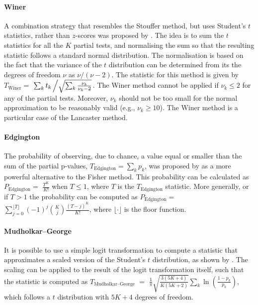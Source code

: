 \paragraph{Winer} A combination strategy that resembles the Stouffer method, but uses Student's $t$ statistics, rather than $z$-scores was proposed by \citet{Winer1962}. The idea is to sum the $t$ statistics for all the $K$ partial tests, and normalising the sum so that the resulting statistic follows a standard normal distribution. The normalisation is based on the fact that the variance of the $t$ distribution can be determined from its the degrees of freedom $\nu$ as $\nu/(\nu-2)$. The statistic for this method is given by $T_{\text{Winer}}=$ $\sum_{k}t_{k}\left/\sqrt{\sum_{k}\frac{\nu_{k}}{\nu_{k}-2}}\right.$. The Winer method cannot be applied if $\nu_{k} \leqslant 2$ for any of the partial tests. Moreover, $\nu_{k}$ should not be too small for the normal approximation to be reasonably valid (e.g., $\nu_{k} \geqslant 10$). The Winer method is a particular case of the Lancaster method.

\paragraph{Edgington} The probability of observing, due to chance, a value equal or smaller than the sum of the partial p-values, $T_{\text{Edgington}}=\sum_{k} p_{k}$, was proposed by \citet{Edgington1972} as a more powerful alternative to the Fisher method. This probability can be calculated as $P_{\text{Edgington}} =$ $\frac{T^K}{K!}$ when $T \leqslant 1$, where $T$ is the $T_{\text{Edgington}}$ statistic. More generally, or if $T>1$ the probability can be computed as $P_{\text{Edgington}} =$ $\sum_{j=0}^{\lfloor T \rfloor}(-1)^j \binom{K}{j}\frac{(T-j)^K}{K!}$, where $\lfloor \cdot \rfloor$ is the floor function.

\paragraph{Mudholkar--George} It is possible to use a simple logit transformation to compute a statistic that approximates a scaled version of the Student's $t$ distribution, as shown by \citet{Mudholkar1979}. The scaling can be applied to the result of the logit transformation itself, such that the statistic is computed as $T_{\text{Mudholkar--George}}$ $=$ $\frac{1}{\pi}\sqrt{\frac{3(5K+4)}{K(5K+2)}}\sum_{k} \ln\left(\frac{1-p_{k}}{p_{k}}\right)$, which follows a $t$ distribution with $5K+4$ degrees of freedom.

